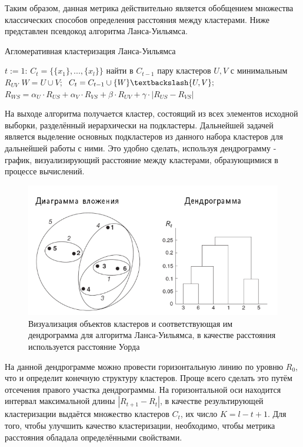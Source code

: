 Таким образом, данная метрика действительно является обобщением множества классических способов определения расстояния между кластерами. Ниже представлен псевдокод алгоритма Ланса-Уильямса.

\begin{algorithm}
\caption{Агломеративная кластеризация Ланса-Уильямса}\label{Lance–Williams}
\begin{algorithmic}
\State $t:=1$: $C_t = \{\{x_1\},...,\{x_l\}\}$
\State найти в $C_{t - 1}$ пару кластеров $U, V$ с минимальным $R_{UV}$
\State $W = U \cup V;$
\State $C_t = C_{t - 1} \cup \{W\} \textbackslash \{U, V\};$
\State $R_{WS} = \alpha_U \cdot R_{US} + \alpha_V \cdot R_{VS} + \beta \cdot R_{UV} + \gamma \cdot |R_{US} - R_{VS}|$

\end{algorithmic}
\end{algorithm}

На выходе алгоритма получается кластер, состоящий из всех элементов исходной выборки, разделённый иерархически на подкластеры. Дальнейшей задачей является выделение основных подкластеров из данного набора кластеров для дальнейшей работы с ними. Это удобно сделать, используя дендрограмму - график, визуализирующий расстояние между кластерами, образующимися в процессе вычислений.

\begin{center}
\begin{figure}[H]
\includegraphics[width=14cm]{png/Dendrogramma.png}
\caption{Визуализация объектов кластеров и соответствующая им дендрограмма для алгоритма Ланса-Уильямса, в качестве расстояния используется расстояние Уорда}
\label{fig:Dendrogramma}
\end{figure}
\end{center}

На данной дендрограмме можно провести горизонтальную линию по уровню $R_0$, что и определит конечную структуру кластеров. Проще всего сделать это путём отсечения правого участка дендрограммы. На горизонтальной оси находится интервал максимальной длины $|R_{t+1} - R_t|$, в качестве результирующей кластеризации выдаётся множество кластеров $C_t$, их число $K = l - t + 1$. Для того, чтобы улучшить качество кластеризации, необходимо, чтобы метрика расстояния обладала определёнными свойствами.

